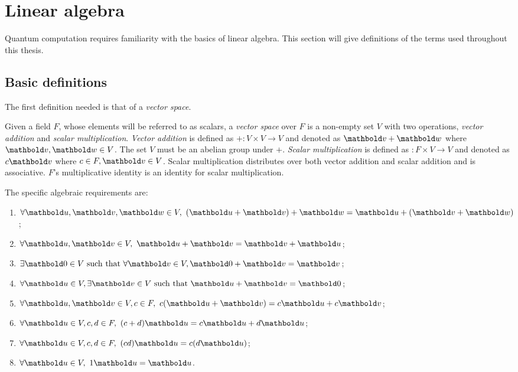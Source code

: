 \section{Linear algebra}\label{sec:linearalgebra}
Quantum computation requires  familiarity with 
the basics of linear algebra. This section will give definitions of the 
terms used throughout this thesis.
\subsection{Basic definitions}\label{subsec:labasicdefinitions}

The first definition needed is that of a \emph{vector space}.

\begin{definition}
Given a field $F$, whose elements will be referred to as scalars,
 a \emph{vector space} over $F$ is a non-empty set $V$ with
two operations, \emph{vector addition} and \emph{scalar multiplication}.
\emph{Vector addition} is defined 
as ${+}:V\times V \to V$ and denoted as $\vc{v}+\vc{w}$
 where
$\vc{v},\vc{w}\in V$. The set $V$ must be an abelian group under $+$.
\emph{Scalar multiplication} is defined as ${}:F\times V \to V$ and denoted as
$c\vc{v}$ where $c\in F, \vc{v} \in V$. Scalar multiplication 
distributes over both vector addition and scalar addition and is
 associative. $F$'s multiplicative identity is 
an identity for scalar multiplication.
\end{definition}
The specific algebraic requirements are:
\begin{enumerate}
\item{}$\forall \vc{u},\vc{v},\vc{w} \in V,\ (\vc{u} +\vc{v}) +\vc{w} =
 \vc{u}+ (\vc{v}+\vc{w})$;
\item{}$\forall \vc{u},\vc{v} \in V,\ \vc{u} +\vc{v} =
 \vc{v}+ \vc{u}$;
\item{}$\exists  \vc{0} \in V \mathrm{\ such\ that\ } \forall \vc{v} \in V, 
 \vc{0} +\vc{v} =  \vc{v}$;
\item{}$\forall \vc{u} \in V, \exists \vc{v} \in V \mathrm{\ such\ that\ } 
 \vc{u}+ \vc{v} = \vc{0}$;
\item{}$\forall \vc{u},\vc{v} \in V, c\in F,\ 
 c(\vc{u}+ \vc{v}) = c\vc{u} + c\vc{v}$;
\item{}$\forall \vc{u} \in V, c,d\in F,\ 
 (c+d)\vc{u} = c\vc{u} + d\vc{u}$;
\item{}$\forall \vc{u} \in V, c,d\in F,\ 
 (c d)\vc{u} = c(d\vc{u})$;
\item{}$\forall \vc{u} \in V,\ 
 1\vc{u} = \vc{u}$.
\end{enumerate}


